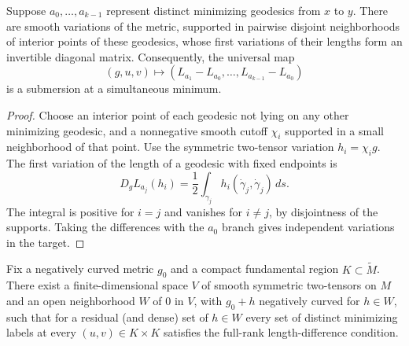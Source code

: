\begin{lemma}\label{lem:metric-submersion}
Suppose $a_0,\ldots,a_{k-1}$ represent distinct
minimizing geodesics from $x$ to $y$.
There are smooth variations of the metric,
supported in pairwise disjoint neighborhoods
of interior points of these geodesics, whose
first variations of their lengths form an
invertible diagonal matrix. Consequently,
the universal map
\[
 (g,u,v)\longmapsto
 (L_{a_1}-L_{a_0},\ldots,L_{a_{k-1}}-L_{a_0})
\]
is a submersion at a simultaneous minimum.
\end{lemma}

\begin{proof}
Choose an interior point of each geodesic not
lying on any other minimizing geodesic, and
a nonnegative smooth cutoff $\chi_i$ supported
in a small neighborhood of that point.
Use the symmetric two-tensor variation
$h_i=\chi_i g$. The first variation of the
length of a geodesic with fixed endpoints is
\[
 D_g L_{a_j}(h_i)
 =\frac12\int_{\gamma_j}
    h_i(\dot\gamma_j,\dot\gamma_j)\,ds.
\]
The integral is positive for $i=j$ and
vanishes for $i\ne j$, by disjointness of
the supports. Taking the differences with
the $a_0$ branch gives independent
variations in the target.
\end{proof}

\begin{lemma}\label{lem:finite-parameter-genericity}
Fix a negatively curved metric $g_0$ and a compact
fundamental region $K\subset\widetilde M$.
There exist a finite-dimensional space $V$ of
smooth symmetric two-tensors on $M$ and an open
neighborhood $W$ of $0$ in $V$, with $g_0+h$
negatively curved for $h\in W$, such that for
a residual (and dense) set of $h\in W$ every
set of distinct minimizing labels at every
$(u,v)\in K\times K$ satisfies the full-rank
length-difference condition.
\end{lemma}


